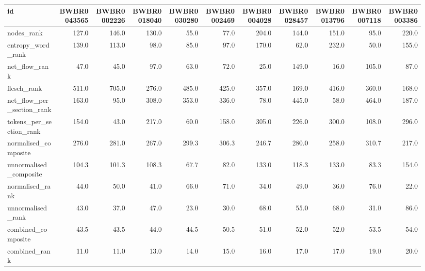 \begin{tabular}{lrrrrrrrrrr}
\toprule
id & BWBR0043565 & BWBR0002226 & BWBR0018040 & BWBR0030280 & BWBR0002469 & BWBR0004028 & BWBR0028457 & BWBR0013796 & BWBR0007118 & BWBR0003386 \\
\midrule
nodes\_rank & 127.0 & 146.0 & 130.0 & 55.0 & 77.0 & 204.0 & 144.0 & 151.0 & 95.0 & 220.0 \\
\cline{1-11}
entropy\_word\_rank & 139.0 & 113.0 & 98.0 & 85.0 & 97.0 & 170.0 & 62.0 & 232.0 & 50.0 & 155.0 \\
\cline{1-11}
net\_flow\_rank & 47.0 & 45.0 & 97.0 & 63.0 & 72.0 & 25.0 & 149.0 & 16.0 & 105.0 & 87.0 \\
\cline{1-11}
flesch\_rank & 511.0 & 705.0 & 276.0 & 485.0 & 425.0 & 357.0 & 169.0 & 416.0 & 360.0 & 168.0 \\
\cline{1-11}
net\_flow\_per\_section\_rank & 163.0 & 95.0 & 308.0 & 353.0 & 336.0 & 78.0 & 445.0 & 58.0 & 464.0 & 187.0 \\
\cline{1-11}
tokens\_per\_section\_rank & 154.0 & 43.0 & 217.0 & 60.0 & 158.0 & 305.0 & 226.0 & 300.0 & 108.0 & 296.0 \\
\cline{1-11}
normalised\_composite & 276.0 & 281.0 & 267.0 & 299.3 & 306.3 & 246.7 & 280.0 & 258.0 & 310.7 & 217.0 \\
\cline{1-11}
unnormalised\_composite & 104.3 & 101.3 & 108.3 & 67.7 & 82.0 & 133.0 & 118.3 & 133.0 & 83.3 & 154.0 \\
\cline{1-11}
normalised\_rank & 44.0 & 50.0 & 41.0 & 66.0 & 71.0 & 34.0 & 49.0 & 36.0 & 76.0 & 22.0 \\
\cline{1-11}
unnormalised\_rank & 43.0 & 37.0 & 47.0 & 23.0 & 30.0 & 68.0 & 55.0 & 68.0 & 31.0 & 86.0 \\
\cline{1-11}
combined\_composite & 43.5 & 43.5 & 44.0 & 44.5 & 50.5 & 51.0 & 52.0 & 52.0 & 53.5 & 54.0 \\
\cline{1-11}
combined\_rank & 11.0 & 11.0 & 13.0 & 14.0 & 15.0 & 16.0 & 17.0 & 17.0 & 19.0 & 20.0 \\
\cline{1-11}
\bottomrule
\end{tabular}
